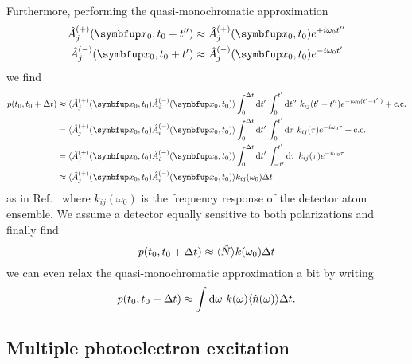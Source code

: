 Furthermore, performing the quasi-monochromatic approximation
\begin{align}
	\hat{A}_j^{(+)}(\vb{x}_0,t_0+t^{\prime\prime})
	&\approx
	\hat{A}_j^{(+)}(\vb{x}_0,t_0)
	e^{+i\omega_0t^{\prime\prime}}
	\\
	\hat{A}_j^{(-)}(\vb{x}_0,t_0+t^{\prime})
	&\approx
	\hat{A}_j^{(-)}(\vb{x}_0,t_0)
	e^{-i\omega_0t^{\prime}}
\end{align}
we find
\begin{equation}
	\begin{split}
		p(t_0,t_0+\Delta t)
		&\approx
		\expval{
			\hat{A}_j^{(+)}(\vb{x}_0,t_0)
			\hat{A}_i^{(-)}(\vb{x}_0,t_0)
		}
		\int_0^{\Delta t}\dd{t^\prime}
		\int_0^{t^\prime}\dd{t^{\prime\prime}}
		k_{ij}(t^{\prime}-t^{\prime\prime})
		e^{-i\omega_0(t^\prime-t^{\prime\prime})}
		+
		\text{c.c.}
		\\
		&=
		\expval{
			\hat{A}_j^{(+)}(\vb{x}_0,t_0)
			\hat{A}_i^{(-)}(\vb{x}_0,t_0)
		}
		\int_0^{\Delta t}\dd{t^\prime}
		\int_0^{t^\prime}\dd{\tau}
		k_{ij}(\tau)
		e^{-i\omega_0\tau}
		+
		\text{c.c.}
		\\
		&=
		\expval{
			\hat{A}_j^{(+)}(\vb{x}_0,t_0)
			\hat{A}_i^{(-)}(\vb{x}_0,t_0)
		}
		\int_0^{\Delta t}\dd{t^\prime}
		\int_{-t^\prime}^{t^\prime}\dd{\tau}
		k_{ij}(\tau)
		e^{-i\omega_0\tau}
		\\
		&\approx
		\expval{
			\hat{A}_j^{(+)}(\vb{x}_0,t_0)
			\hat{A}_i^{(-)}(\vb{x}_0,t_0)
		}
		k_{ij}(\omega_0)
		\Delta t
	\end{split}
\end{equation}
as in Ref.~\cite[p.~699]{Mandel1995} where $k_{ij}(\omega_0)$ is the frequency response of the detector atom ensemble.
We assume a detector equally sensitive to both polarizations and finally find
\begin{equation}
	p(t_0,t_0+\Delta t)
	\approx
	\langle\hat{N}\rangle
	k(\omega_0)
	\Delta t
\end{equation}
we can even relax the quasi-monochromatic approximation a bit by writing
\begin{equation}
	p(t_0,t_0+\Delta t)
	\approx
	\int\dd{\omega}
	k(\omega)
	\expval{\hat{n}(\omega)}
	\Delta t
	.
\end{equation}

\subsection{Multiple photoelectron excitation}



